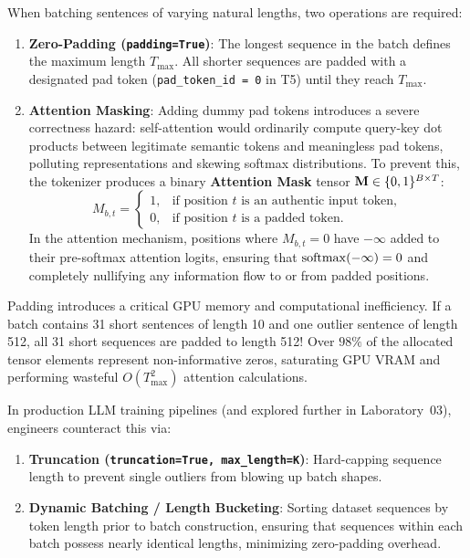 \documentclass[../labs.tex]{subfiles}
\begin{document}
When batching sentences of varying natural lengths, two operations are required:
\begin{enumerate}
    \item \textbf{Zero-Padding (\texttt{padding=True})}: The longest sequence in the batch defines the maximum length $T_{\text{max}}$. All shorter sequences are padded with a designated pad token (\texttt{pad\_token\_id = 0} in T5) until they reach $T_{\text{max}}$.
    \item \textbf{Attention Masking}: Adding dummy pad tokens introduces a severe correctness hazard: self-attention would ordinarily compute query-key dot products between legitimate semantic tokens and meaningless pad tokens, polluting representations and skewing softmax distributions. To prevent this, the tokenizer produces a binary \textbf{Attention Mask} tensor $\mathbf{M} \in \{0, 1\}^{B \times T}$:
    \begin{equation}
        M_{b, t} = \begin{cases}
            1, & \text{if position } t \text{ is an authentic input token}, \\
            0, & \text{if position } t \text{ is a padded token}.
        \end{cases}
    \end{equation}
    In the attention mechanism, positions where $M_{b, t} = 0$ have $-\infty$ added to their pre-softmax attention logits, ensuring that $\operatorname{\mathrm{softmax}}(-\infty) = 0$ and completely nullifying any information flow to or from padded positions.
\end{enumerate}

\begin{examinsight}
Padding introduces a critical GPU memory and computational inefficiency. If a batch contains 31 short sentences of length 10 and one outlier sentence of length 512, all 31 short sequences are padded to length 512! Over $98\%$ of the allocated tensor elements represent non-informative zeros, saturating GPU VRAM and performing wasteful $O(T_{\text{max}}^2)$ attention calculations.

In production LLM training pipelines (and explored further in Laboratory~03), engineers counteract this via:
\begin{enumerate}
    \item \textbf{Truncation (\texttt{truncation=True, max\_length=K})}: Hard-capping sequence length to prevent single outliers from blowing up batch shapes.
    \item \textbf{Dynamic Batching / Length Bucketing}: Sorting dataset sequences by token length prior to batch construction, ensuring that sequences within each batch possess nearly identical lengths, minimizing zero-padding overhead.
\end{enumerate}
\end{examinsight}
\end{document}
